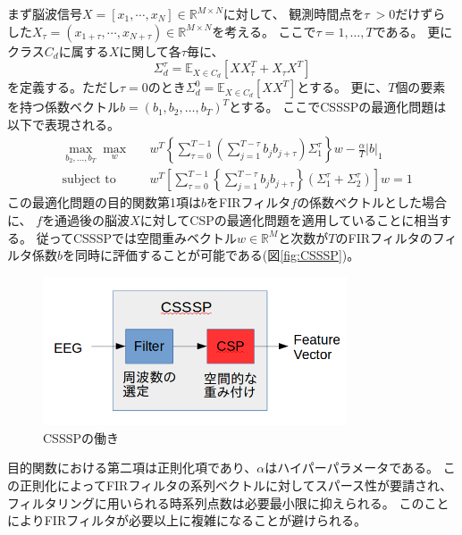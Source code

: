 まず脳波信号\(X = \left[ x_1, \cdots, x_N \right] \in \mathbb{R}^{M \times N}\)に対して、
観測時間点を\(\tau\ > 0\)だけずらした\(X_{\tau} = \left( x_{1+\tau}, \cdots, x_{N+\tau} \right) \in \mathbb{R}^{M \times N}\)を考える。
ここで$\tau = 1,\ldots,T$である。
更にクラス\( C_d \)に属する\( X \)に関して各\(\tau\)毎に、
\begin{equation}
    \Sigma_{d}^{\tau} = \mathbb E_{X \in C_d} \left[ XX_{\tau}^T + X_{\tau}X^T \right]
\end{equation}
を定義する。ただし\(\tau=0\)のとき\( \Sigma_{d}^{0} = \mathbb E_{X \in C_d} \left[XX^T \right] \)とする。
更に、\(T\)個の要素を持つ係数ベクトル$b=(b_1,b_2,\ldots,b_T)^T$とする。
ここでCSSSPの最適化問題は以下で表現される。
\begin{equation}
    \begin{aligned}
        & \max_{b_2,\ldots,b_T} \max_{w}
        & & w^T \left\{ \sum_{\tau = 0}^{T-1} \left( \sum_{j=1}^{T-\tau} b_j b_{j+\tau} \right) \Sigma_1^{\tau} \right\} w - \frac{\alpha}{T}|b|_1 \\
        & \text{subject to}
        & &  w^T \left[\sum_{\tau = 0}^{T-1} \left\{ \sum_{j=1}^{T-\tau}b_jb_{j+\tau} \right\} (\Sigma_1^{\tau} + \Sigma_2^{\tau}) \right] w = 1
    \end{aligned}
    \label{eq:csssp}
\end{equation}
この最適化問題の目的関数第1項は\(b\)をFIRフィルタ\(f\)の係数ベクトルとした場合に、
\(f\)を通過後の脳波\(X\)に対してCSPの最適化問題を適用していることに相当する。
従ってCSSSPでは空間重みベクトル\(w \in \mathbb R^M\)と次数が\(T\)のFIRフィルタのフィルタ係数\(b\)を同時に評価することが可能である(図\ref{fig:CSSSP})。
\begin{figure}
    \centering
    \includegraphics[width=9cm]{images/CSSSP.png}
    \caption{CSSSPの働き}
    \label{fig:FBCSP}
\end{figure}
目的関数における第二項は正則化項であり、$\alpha$はハイパーパラメータである。
この正則化によってFIRフィルタの系列ベクトルに対してスパース性が要請され、
フィルタリングに用いられる時系列点数は必要最小限に抑えられる。
このことによりFIRフィルタが必要以上に複雑になることが避けられる。

